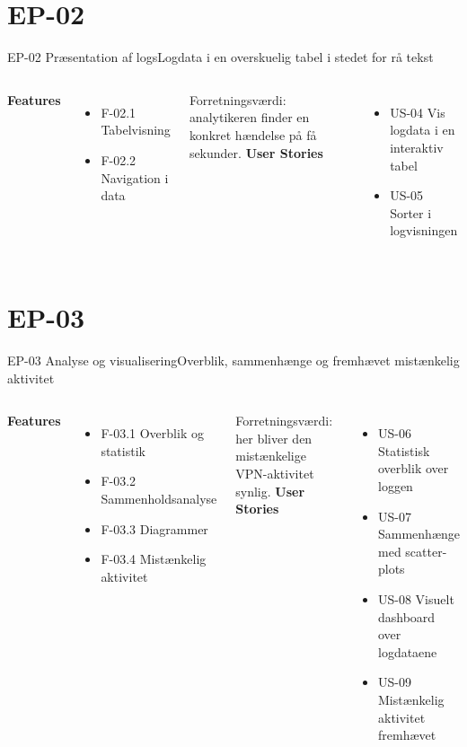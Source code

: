 \documentclass[aspectratio=169,10pt]{beamer}
\newcommand{\done}{\textcolor{accent}{\faCheckCircle}}
\begin{document}
\section{EP-02}
\begin{frame}{EP-02 Præsentation af logs}{Logdata i en overskuelig tabel i stedet for rå tekst}
  \begin{columns}[T]
    \textbf{Features}
    \vspace{0.3em}
    \begin{itemize}
      \item F-02.1 Tabelvisning
      \item F-02.2 Navigation i data
    \end{itemize}
    \vspace{0.4em}
    {\footnotesize\color{muted}Forretningsværdi: analytikeren finder en konkret hændelse på få sekunder.}
    \textbf{User Stories}
    \vspace{0.3em}
    \begin{itemize}
      \item[\done] US-04 Vis logdata i en interaktiv tabel
      \item[\done] US-05 Sorter i logvisningen
    \end{itemize}
  \end{columns}
\end{frame}

\section{EP-03}
\begin{frame}{EP-03 Analyse og visualisering}{Overblik, sammenhænge og fremhævet mistænkelig aktivitet}
  \begin{columns}[T]
    \textbf{Features}
    \vspace{0.3em}
    \begin{itemize}
      \item F-03.1 Overblik og statistik
      \item F-03.2 Sammenholdsanalyse
      \item F-03.3 Diagrammer
      \item F-03.4 Mistænkelig aktivitet
    \end{itemize}
    \vspace{0.2em}
    {\footnotesize\color{muted}Forretningsværdi: her bliver den mistænkelige VPN-aktivitet synlig.}
    \textbf{User Stories}
    \vspace{0.3em}
    \begin{itemize}
      \item[\done] US-06 Statistisk overblik over loggen
      \item[\done] US-07 Sammenhænge med scatter-plots
      \item[\done] US-08 Visuelt dashboard over logdataene
      \item[\done] US-09 Mistænkelig aktivitet fremhævet
    \end{itemize}
  \end{columns}
\end{frame}
\end{document}
